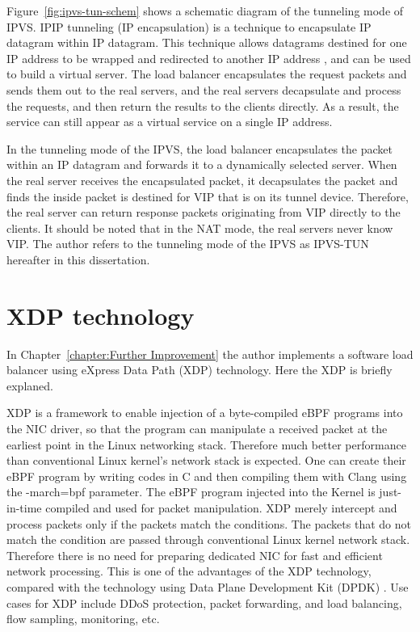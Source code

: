 Figure~\ref{fig:ipvs-tun-schem} shows a schematic diagram of the tunneling mode of IPVS.
IPIP tunneling (IP encapsulation) is a technique to encapsulate IP datagram within IP datagram.
This technique allows datagrams destined for one IP address to be wrapped and redirected to another IP address \cite{kuznetsov1999tunnels}, and can be used to build a virtual server.
The load balancer encapsulates the request packets and sends them out to the real servers,
and the real servers decapsulate and process the requests, and then return the results to the clients directly.
As a result, the service can still appear as a virtual service on a single IP address.

In the tunneling mode of the IPVS, the load balancer encapsulates the packet within an IP datagram and forwards it to a dynamically selected server.
When the real server receives the encapsulated packet, it decapsulates the packet and finds the inside packet is destined for VIP that is on its tunnel device.
Therefore, the real server can return response packets originating from VIP directly to the clients.
It should be noted that in the NAT mode, the real servers never know VIP.
%
The author refers to the tunneling mode of the IPVS as IPVS-TUN hereafter in this dissertation.

\FloatBarrier

\section{XDP technology}

In Chapter~\ref{chapter:Further Improvement} the author implements a software load balancer using eXpress Data Path (XDP) \cite{hoiland2018express} technology.
Here the XDP is briefly explaned.

XDP is a framework to enable injection of a byte-compiled eBPF programs into the NIC driver, so that the program can manipulate a received packet at the earliest point in the Linux networking stack.
Therefore much better performance than conventional Linux kernel's network stack is expected.
One can create their eBPF program by writing codes in C and then compiling them with Clang using the -march=bpf parameter.
The eBPF program injected into the Kernel is just-in-time compiled and used for packet manipulation.
XDP merely intercept and process packets only if the packets match the conditions.
The packets that do not match the condition are passed through conventional Linux kernel network stack.
Therefore there is no need for preparing dedicated NIC for fast and efficient network processing.
This is one of the advantages of the XDP technology, compared with the technology using Data Plane Development Kit (DPDK) \cite{dpdkorg}.
Use cases for XDP include DDoS protection, packet forwarding, and load balancing, flow sampling, monitoring, etc.

